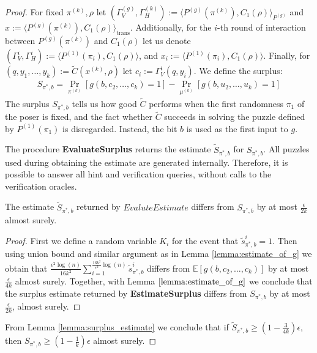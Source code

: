 \begin{proof}
For fixed $\pi^{(k)}, \rho$ let $(\Gamma_V^{(g)}, \Gamma_H^{(k)}) := \langle P^{(g)}(\pi^{(k)}), C_1(\rho) \rangle_{P^{(g)}}$
and $x := \langle P^{(g)}(\pi^{(k)}), C_1(\rho) \rangle_{\text{trans}}$.
Additionally, for the $i$-th round of interaction between $P^{(g)}(\pi^{(k)})$ and $C_1(\rho)$ let us
denote $(\Gamma_V^{i}, \Gamma_H^{i}) := \langle P^{(1)}(\pi_i), C_1(\rho) \rangle$, and $x_i := \langle P^{(1)}(\pi_i), C_1(\rho) \rangle$.
Finally, for $(q,y_1, \dots, y_k) := \widetilde{C}(x^{(k)}, \rho)$ let $c_i := \Gamma_V^i(q,y_i)$.
We define the surplus:
\begin{align}
  \label{eq:s_pi_b}
S_{\pi^*, b} = \underset{\pi^{(k)}}{\Pr}\left[g(b, c_2, \dots, c_k) = 1\right] - \underset{\mu^{(k)}}{\Pr}\left[g(b, u_2, \dots, u_k) = 1\right]
\end{align}
%
The surplus $S_{\pi^*, b}$ tells us how good $\widetilde{C}$ performs when the first randomness $\pi_1$ of the poser is fixed,
and the fact whether $\widetilde{C}$ succeeds in solving the puzzle defined by $P^{(1)}(\pi_1)$ is disregarded.
Instead, the bit $b$ is used as the first input to $g$.

The procedure \textbf{EvaluateSurplus} returns the estimate $\widetilde{S}_{\pi^*, b}$ for $S_{\pi^*, b}$.
All puzzles used during obtaining the estimate are generated internally.
Therefore, it is possible to answer all hint and verification queries, without calls to the verification oracles.
%
\begin{lemma}
  \label{lemma:surplus_estimate}
The estimate $\widetilde{S}_{\pi^*,b}$ returned by $EvaluteEstimate$ differs from $S_{\pi^*, b}$ by at most $\frac{\epsilon}{2k}$ almost surely.
\end{lemma}

\begin{proof}
First we define a random variable $K_i$ for the event that $\widetilde{s}_{\pi^*,b}^i = 1$. Then using union bound and similar argument as in Lemma \ref{lemma:estimate_of_g}
we obtain that $\frac{\epsilon^2\log(n)}{16k^2} \sum_{i=1}^{\frac{16k^2}{\epsilon^2}\log(n)} \widetilde{s}_{\pi^*,b}^i$ differs from
$\mathbb{E}[g(b, c_2, \dots, c_k)]$ by at most $\frac{\epsilon}{4k}$ almost surely. Together, with Lemma $\ref{lemma:estimate_of_g}$ we conclude that the surplus estimate
returned by \textbf{EstimateSurplus} differs from $S_{\pi^*,b}$ by at most $\frac{\epsilon}{2k}$, almost surely.
\end{proof}
%
From Lemma \ref{lemma:surplus_estimate} we conclude that if $\widetilde{S}_{\pi^*,b} \geq (1-\frac{3}{4k})\epsilon$, then $S_{\pi^*,b} \geq (1-\frac{1}{k})\epsilon$ almost surely.


\end{proof}
